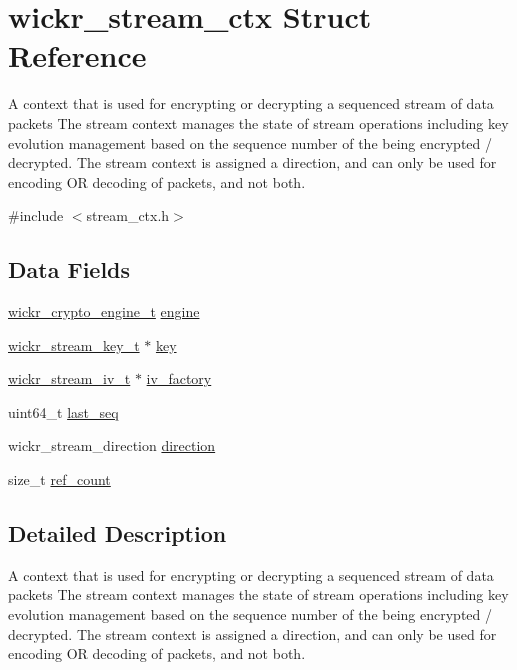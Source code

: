\hypertarget{structwickr__stream__ctx}{}\section{wickr\+\_\+stream\+\_\+ctx Struct Reference}
\label{structwickr__stream__ctx}


A context that is used for encrypting or decrypting a sequenced stream of data packets The stream context manages the state of stream operations including key evolution management based on the sequence number of the being encrypted / decrypted. The stream context is assigned a direction, and can only be used for encoding OR decoding of packets, and not both.  




{\ttfamily \#include $<$stream\+\_\+ctx.\+h$>$}

\subsection*{Data Fields}
\begin{DoxyCompactItemize}
\item 
\mbox{\hyperlink{structwickr__crypto__engine}{wickr\+\_\+crypto\+\_\+engine\+\_\+t}} \mbox{\hyperlink{structwickr__stream__ctx_a14ef322bbeec579ded7f35c5aeb0d3fa}{engine}}
\item 
\mbox{\hyperlink{structwickr__stream__key}{wickr\+\_\+stream\+\_\+key\+\_\+t}} $\ast$ \mbox{\hyperlink{structwickr__stream__ctx_a3598b3c0415d13fafab6633f8c00a3c8}{key}}
\item 
\mbox{\hyperlink{structwickr__stream__iv}{wickr\+\_\+stream\+\_\+iv\+\_\+t}} $\ast$ \mbox{\hyperlink{structwickr__stream__ctx_a67c5066e87dbdc026358563daa51f174}{iv\+\_\+factory}}
\item 
uint64\+\_\+t \mbox{\hyperlink{structwickr__stream__ctx_abf2c6ab54e1663e6a47e310fd68b3b3f}{last\+\_\+seq}}
\item 
wickr\+\_\+stream\+\_\+direction \mbox{\hyperlink{structwickr__stream__ctx_a34c622c3ca61348321261ee7a9c3ff91}{direction}}
\item 
size\+\_\+t \mbox{\hyperlink{structwickr__stream__ctx_aa0e74b2c117666501373a5947d92e8c4}{ref\+\_\+count}}
\end{DoxyCompactItemize}


\subsection{Detailed Description}
A context that is used for encrypting or decrypting a sequenced stream of data packets The stream context manages the state of stream operations including key evolution management based on the sequence number of the being encrypted / decrypted. The stream context is assigned a direction, and can only be used for encoding OR decoding of packets, and not both. 

